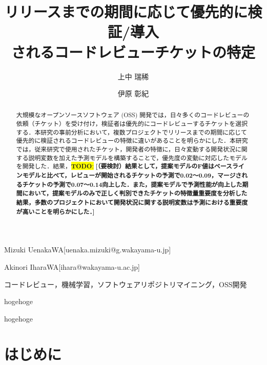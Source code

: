 \documentclass[submit]{ipsj}
\newcommand{\todo}[1]{\colorbox{yellow}{{\bf TODO}:}{\color{red} {\textbf{[#1]}}}}
\begin{document}
\title{リリースまでの期間に応じて優先的に検証/導入\\されるコードレビューチケットの特定}




\author{上中 瑞稀}{Mizuki Uenaka}{WA}[uenaka.mizuki@g.wakayama-u.jp]
\author{伊原 彰紀}{Akinori Ihara}{WA}[ihara@wakayama-u.ac.jp]

\begin{abstract}
大規模なオープンソースソフトウェア (OSS) 開発では，日々多くのコードレビューの依頼（チケット）を受け付け，検証者は優先的にコードレビューするチケットを選択する．本研究の事前分析において，複数プロジェクトでリリースまでの期間に応じて優先的に検証されるコードレビューの特徴に違いがあることを明らかにした．本研究では，従来研究で使用されたチケット，開発者の特徴に，日々変動する開発状況に関する説明変数を加えた予測モデルを構築することで，優先度の変動に対応したモデルを開発した．結果，\todo{（要検討）結果として，提案モデルのF値はベースラインモデルと比べて，レビューが開始されるチケットの予測で0.02〜0.09，マージされるチケットの予測で0.07〜0.14向上した．また，提案モデルで予測性能が向上した期間において，提案モデルのみで正しく判別できたチケットの特徴量重要度を分析した結果，多数のプロジェクトにおいて開発状況に関する説明変数は予測における重要度が高いことを明らかにした．}
\end{abstract}


\begin{jkeyword}
コードレビュー，機械学習，ソフトウェアリポジトリマイニング，OSS開発
\end{jkeyword}

\begin{eabstract}
hogehoge
\end{eabstract}

\begin{ekeyword}
hogehoge
\end{ekeyword}

\maketitle

\section{はじめに}
\end{document}

